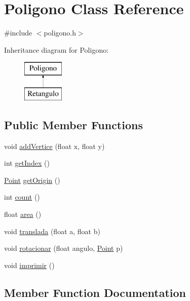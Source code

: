 \hypertarget{class_poligono}{}\section{Poligono Class Reference}
\label{class_poligono}


{\ttfamily \#include $<$poligono.\+h$>$}

Inheritance diagram for Poligono\+:\begin{figure}[H]
\begin{center}
\leavevmode
\includegraphics[height=2.000000cm]{class_poligono}
\end{center}
\end{figure}
\subsection*{Public Member Functions}
\begin{DoxyCompactItemize}
\item 
void \hyperlink{class_poligono_a49041ab4bc9ec5edb5a537c2ffd2ee11}{add\+Vertice} (float x, float y)
\item 
int \hyperlink{class_poligono_a84ebaf60416645892d91d1eb171e0442}{get\+Index} ()
\item 
\hyperlink{class_point}{Point} \hyperlink{class_poligono_a44c44b946558ffd10179d101bb9017ec}{get\+Origin} ()
\item 
int \hyperlink{class_poligono_ae4022d848bf0c3a4d4e3868ae4402250}{count} ()
\item 
float \hyperlink{class_poligono_a7f66c446f86c19118663ef1b2c8a4be6}{area} ()
\item 
void \hyperlink{class_poligono_adbf605dfd0419b7301c9be0ec1dbe41b}{translada} (float a, float b)
\item 
void \hyperlink{class_poligono_a793b09b4f7cfd02930318521d008362d}{rotacionar} (float angulo, \hyperlink{class_point}{Point} p)
\item 
void \hyperlink{class_poligono_a754dee9ed6a8fee4eb1a9d0aa0e1707a}{imprimir} ()
\end{DoxyCompactItemize}


\subsection{Member Function Documentation}
\mbox{\label{class_poligono_a49041ab4bc9ec5edb5a537c2ffd2ee11}} 
